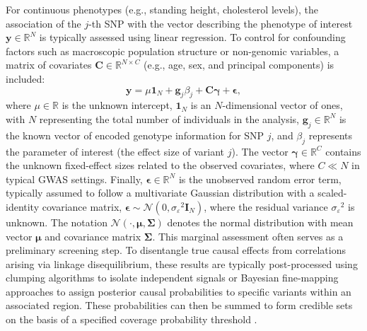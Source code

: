 For continuous phenotypes (e.g., standing height, cholesterol levels), the association of the \(j\)-th SNP with the vector describing the phenotype of interest $\bm{y} \in \mathbb{R}^N$ is typically assessed using linear regression. To control for confounding factors such as macroscopic population structure or non-genomic variables, a matrix of covariates \( \bm{C} \in \mathbb{R}^{N \times C} \) (e.g., age, sex, and principal components) is included:
\begin{equation}
\bm{y} = \mu \bm{1}_N + \bm{g}_j \beta_j + \bm{C}\bm{\gamma} + \bm{\epsilon},
\end{equation}
where $\mu \in \mathbb{R}$ is the unknown intercept, $\bm{1}_N$ is an $N$-dimensional vector of ones, with $N$ representing
the total number of individuals in the analysis, $\bm{g}_j \in \mathbb{R}^N$ is the known vector of encoded genotype information for SNP $j$, and $\beta_j$ represents the parameter of interest (the effect size of variant $j$). The vector $\bm{\gamma} \in \mathbb{R}^C$ contains the unknown fixed-effect sizes related to the observed covariates, where $C \ll N$ in typical GWAS settings. Finally, $\bm{\epsilon} \in \mathbb{R}^N$ is the unobserved random error term, typically assumed to follow a multivariate Gaussian distribution with a scaled-identity covariance matrix, $\bm{\epsilon} \sim \mathcal{N}(0, {\sigma_{\varepsilon}}^2 \bm{I}_N)$, where the residual variance ${\sigma_{\varepsilon}}^2$ is unknown. The notation $\mathcal{N}(\cdot, \bm{\mu}, \bm{\Sigma})$ denotes the normal distribution with mean vector $\bm{\mu}$ and covariance matrix $\bm{\Sigma}$. This marginal assessment often serves as a preliminary screening step. To disentangle true causal effects from correlations arising via linkage disequilibrium, these results are typically post-processed using clumping algorithms to isolate independent signals or Bayesian fine-mapping approaches to assign posterior causal probabilities to specific variants within an associated region. These probabilities can then be summed to form credible sets on the basis of a specified coverage probability threshold \cite{FineMapping2018}.

